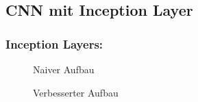 \documentclass[runningheads,a4paper]{llncs}[2015/06/24]
\begin{document}
\subsection{CNN mit Inception Layer}
\subsubsection*{Inception Layers:}
\begin{figure}
	\centering
	\caption{Naiver Aufbau}
	\label{fig:inception_graph}
\end{figure}
\begin{figure}
	\centering
	\caption{Verbesserter Aufbau}
	\label{fig:inception_graph_improved}
\end{figure}
\end{document}

